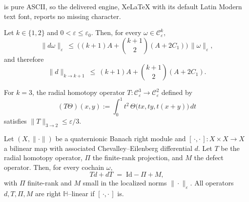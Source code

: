\documentclass[10pt,a4paper]{amsart}
\begin{document}
is pure ASCII, so the delivered engine, XeLaTeX with its default Latin Modern text font, reports no missing character.
\begin{lem}\label{lem:dBound}
Let $k\in\{1,2\}$ and $0<\varepsilon\le\varepsilon_0$. Then, for every
$\omega\in\mathcal C^k_\varepsilon$,
\[
\|d\omega\|_\varepsilon
\ \le\ \Big((k+1)A+\binom{k+1}{2}(A+2C_1)\Big)\,\|\omega\|_\varepsilon,
\]
and therefore
\[
\|d\|_{k\to k+1}\ \le\ (k+1)A+\binom{k+1}{2}(A+2C_1).
\]
\end{lem}

\begin{lem}\label{lem:T bound}
For $k=3$, the radial homotopy operator $T:\mathcal C^3_\varepsilon\to \mathcal C^2_\varepsilon$ defined by
\[
(T\Theta)(x,y):=\int_0^1 t^{2}\,\Theta\big(tx,ty,t(x+y)\big)\,dt
\]
satisfies $\|T\|_{3\to 2}\le \varepsilon/3$.
\end{lem}

\begin{lem}\label{lem:homotopy-q}
Let $(X,\|\cdot\|)$ be a quaternionic Banach right module and
$[\,\cdot,\cdot\,]:X\times X\to X$ a bilinear map with associated
Chevalley--Eilenberg differential $d$.
Let $T$ be the radial homotopy operator, $\Pi$ the finite-rank projection,
and $M$ the defect operator. Then, for every cochain $\omega$,
\[
Td + dT \;=\; \mathrm{Id} - \Pi + M,
\]
with $\Pi$ finite-rank and $M$ small in the localized norms $\|\cdot\|_\varepsilon$.
All operators $d,T,\Pi,M$ are right $\mathbb H$--linear if $[\,\cdot,\cdot\,]$ is.
\end{lem}
\end{document}
